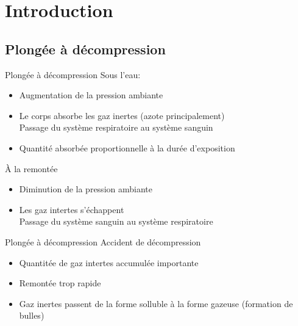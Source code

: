
\section{Introduction}

\subsection{Plongée à décompression}

\begin{frame}{Plongée à décompression}
	Sous l'eau:
	\begin{itemize}
		\item Augmentation de la pression ambiante
		\item Le corps absorbe les gaz inertes (azote principalement)\\
				Passage du système respiratoire au système sanguin
		\item Quantité absorbée proportionnelle à la durée d'exposition
	\end{itemize}
	\vfill
	À la remontée
	\begin{itemize}
		\item Diminution de la pression ambiante
		\item Les gaz intertes s'échappent\\
				Passage du système sanguin au système respiratoire
	\end{itemize}
\end{frame}

\begin{frame}{Plongée à décompression}  
	Accident de décompression
	\begin{itemize}
		\item Quantitée de gaz intertes accumulée importante
		\item Remontée trop rapide
		\item Gaz inertes passent de la forme solluble à la forme gazeuse (formation de bulles)
	\end{itemize}
\end{frame}

